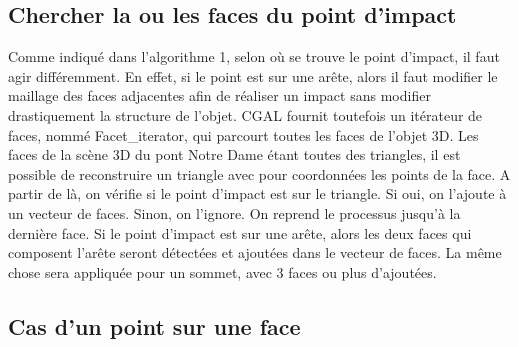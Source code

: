 \documentclass[a4paper,french]{report}
\begin{document}
			\subsection{Chercher la ou les faces du point d'impact}
				Comme indiqué dans l'algorithme 1, selon où se trouve le point d'impact, il faut agir différemment. En effet, si le point est sur une arête, alors il faut modifier le maillage des faces adjacentes afin de réaliser un impact sans modifier drastiquement la structure de l'objet. CGAL fournit toutefois un itérateur de faces, nommé Facet\_iterator, qui parcourt toutes les faces de l'objet 3D. Les faces de la scène 3D du pont Notre Dame étant toutes des triangles, il est possible de reconstruire un triangle avec pour coordonnées les points de la face. A partir de là, on vérifie si le point d'impact est sur le triangle. Si oui, on l'ajoute à un vecteur de faces. Sinon, on l'ignore. On reprend le processus jusqu'à la dernière face. Si le point d'impact est sur une arête, alors les deux faces qui composent l'arête seront détectées et ajoutées dans le vecteur de faces. La même chose sera appliquée pour un sommet, avec 3 faces ou plus d'ajoutées.
			\subsection{Cas d'un point sur une face}
\end{document}
